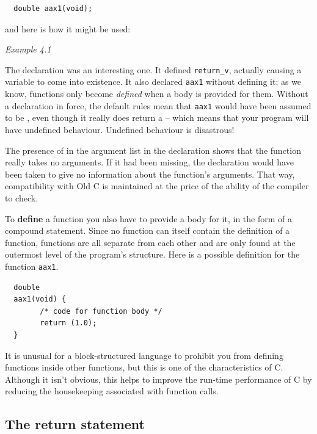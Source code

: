 \begin{Verbatim}
  double aax1(void);
\end{Verbatim}

   and here is how it might be used:


\begin{center}\textit{Example 4.1}\end{center}


   The declaration was an interesting one. It defined
    \texttt{return\_v}, actually causing a variable to come into
    existence. It also declared \texttt{aax1} without defining it; as we
    know, functions only become \textit{defined} when a body is provided for
    them. Without a declaration in force, the default rules mean that
    \texttt{aax1} would have been assumed to be \kint, even
    though it really does return a \double{} -- which means that
    your program will have undefined behaviour. Undefined behaviour is
    disastrous!


   The presence of \void{} in the argument list in the
    declaration shows that the function really takes no arguments. If it had
    been missing, the declaration would have been taken to give no
    information about the function's arguments. That way, compatibility with
    Old C is maintained at the price of the ability of the compiler to
    check.


   To \textbf{define} a function you also have to provide a body for
    it, in the form of a compound statement. Since no function can itself
    contain the definition of a function, functions are all separate from
    each other and are only found at the outermost level of the program's
    structure. Here is a possible definition for the function
    \texttt{aax1}.

\begin{Verbatim}
  double
  aax1(void) {
        /* code for function body */
        return (1.0);
  }
\end{Verbatim}

   It is unusual for a block-structured language to prohibit you from
    defining functions inside other functions, but this is one of the
    characteristics of C. Although it isn't obvious, this helps to improve
    the run-time performance of C by reducing the housekeeping associated
    with function calls.


  

  \subsection{The return statement}
   

